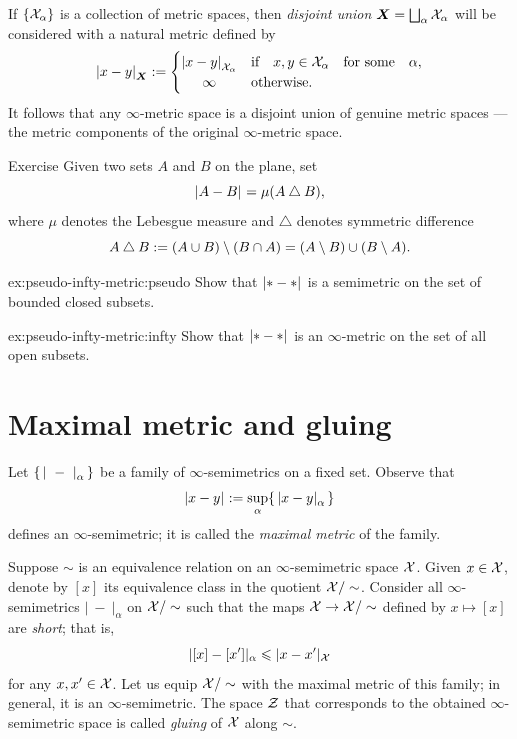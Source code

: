 If $\{\mathcal{X}_\alpha\}$ is a collection of metric spaces, then \emph{disjoint union} $\bm{X}\z=\bigsqcup_\alpha\spc{X}_\alpha$ will be considered with a natural metric defined by
\[\dist{x}{y}{\bm{X}}
\df
\begin{cases}
\dist{x}{y}{\spc{X}_\alpha}&\text{if}\quad x,y\in \spc{X}_\alpha\quad\text{for some}\quad \alpha,
\\
\hfil \infty&\text{otherwise.}
\end{cases}
\]
It follows that any $\infty$-metric space is a disjoint union of genuine metric spaces --- the metric components of the original $\infty$-metric space.

\begin{thm}{Exercise}\label{ex:pseudo-infty-metric}
Given two sets $A$ and $B$ on the plane, set 
\[\dist{A}{B}{}=\mu(A\bigtriangleup B),\]
where $\mu$ denotes the Lebesgue measure and $\bigtriangleup$ denotes symmetric difference
\[A\bigtriangleup B
\mathrel{:=}(A\cup B)\setminus(B\cap A)
=(A\setminus B)\cup(B\setminus A).\]

\begin{subthm}{ex:pseudo-infty-metric:pseudo}
Show that $\dist{*}{*}{}$ is a semimetric on the set of bounded closed subsets.
\end{subthm}

\begin{subthm}{ex:pseudo-infty-metric:infty}
Show that $\dist{*}{*}{}$ is an $\infty$-metric on the set of all open subsets.
\end{subthm}
\end{thm}

\section{Maximal metric and gluing}
\label{sec:max+glue}

Let $\{\,\dist{\ }{\ }{\alpha}\,\}$ be a family of $\infty$-semimetrics on a fixed set.
Observe that
\[\dist{x}{y}{}\df\sup_\alpha\{\,\dist{x}{y}{\alpha}\,\}\]
defines an $\infty$-semimetric; it is called the \emph{maximal metric} of the family.

Suppose $\sim$ is an equivalence relation on an $\infty$-semimetric space $\mathcal{X}$.
Given $x\in\mathcal{X}$, 
denote by $[x]$ its equivalence class in the quotient $\mathcal{X}/\sim$.
Consider all $\infty$-semimetrics $|\ -\ |_\alpha$ on $\mathcal{X}/\sim$ such that the maps $\mathcal{X}\to \mathcal{X}/\sim$ defined by $x\mapsto [x]$ are \emph{short};
that is,
\[|[x]-[x']|_\alpha\leqslant |x-x'|_{\mathcal{X}}\]
for any $x,x'\in \mathcal{X}$.
Let us equip $\mathcal{X}/\sim$ with the maximal metric of this family; in general, it is an $\infty$-semimetric.
The space $\mathcal{Z}$ that corresponds to the obtained $\infty$-semimetric space is called \emph{gluing} of $\mathcal{X}$ along $\sim$.

